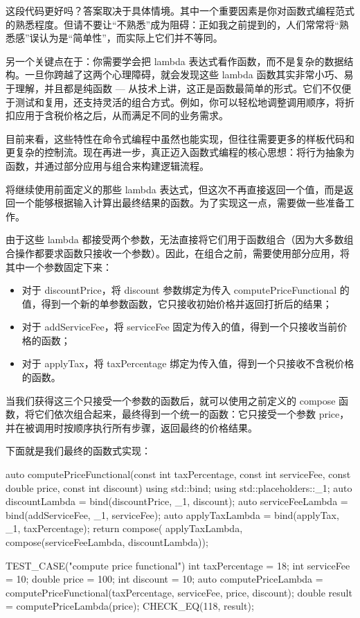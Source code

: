 这段代码更好吗？答案取决于具体情境。其中一个重要因素是你对函数式编程范式的熟悉程度。但请不要让“不熟悉”成为阻碍：正如我之前提到的，人们常常将“熟悉感”误认为是“简单性”，而实际上它们并不等同。

另一个关键点在于：你需要学会把 lambda 表达式看作函数，而不是复杂的数据结构。一旦你跨越了这两个心理障碍，就会发现这些 lambda 函数其实非常小巧、易于理解，并且都是纯函数 --- 从技术上讲，这正是函数最简单的形式。它们不仅便于测试和复用，还支持灵活的组合方式。例如，你可以轻松地调整调用顺序，将折扣应用于含税价格之后，从而满足不同的业务需求。

目前来看，这些特性在命令式编程中虽然也能实现，但往往需要更多的样板代码和更复杂的控制流。现在再进一步，真正迈入函数式编程的核心思想：将行为抽象为函数，并通过部分应用与组合来构建逻辑流程。

将继续使用前面定义的那些 lambda 表达式，但这次不再直接返回一个值，而是返回一个能够根据输入计算出最终结果的函数。为了实现这一点，需要做一些准备工作。

由于这些 lambda 都接受两个参数，无法直接将它们用于函数组合（因为大多数组合操作都要求函数只接收一个参数）。因此，在组合之前，需要使用部分应用，将其中一个参数固定下来：

\begin{itemize}
\item 
对于 discountPrice，将 discount 参数绑定为传入 computePriceFunctional 的值，得到一个新的单参数函数，它只接收初始价格并返回打折后的结果；

\item 
对于 addServiceFee，将 serviceFee 固定为传入的值，得到一个只接收当前价格的函数；

\item 
对于 applyTax，将 taxPercentage 绑定为传入值，得到一个只接收不含税价格的函数。
\end{itemize}

当我们获得这三个只接受一个参数的函数后，就可以使用之前定义的 compose 函数，将它们依次组合起来，最终得到一个统一的函数：它只接受一个参数 price，并在被调用时按顺序执行所有步骤，返回最终的价格结果。

下面就是我们最终的函数式实现：

\begin{cpp}
auto computePriceFunctional(const int taxPercentage, const int
serviceFee, const double price, const int discount){
  using std::bind;
  using std::placeholders::_1;
  auto discountLambda = bind(discountPrice, _1, discount);
  auto serviceFeeLambda = bind(addServiceFee, _1, serviceFee);
  auto applyTaxLambda = bind(applyTax, _1, taxPercentage);
  return compose( applyTaxLambda, compose(serviceFeeLambda,
  discountLambda));
}

TEST_CASE("compute price functional"){
  int taxPercentage = 18;
  int serviceFee = 10;
  double price = 100;
  int discount = 10;
  auto computePriceLambda = computePriceFunctional(taxPercentage,
  serviceFee, price, discount);
  double result = computePriceLambda(price);
  CHECK_EQ(118, result);
}
\end{cpp}

